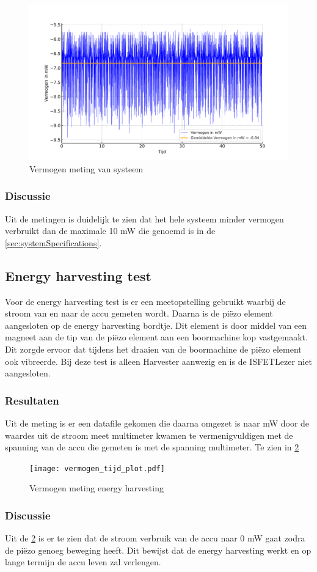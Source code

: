 \begin{figure}[ht]
    \centering
    \includegraphics[width=\textwidth]{img/vermogensMeting.pdf}
    \caption{Vermogen meting van systeem}
    \label{fig:vermogenMeting}
\end{figure}

\subsubsection{Discussie}
Uit de metingen is duidelijk te zien dat het hele systeem minder vermogen verbruikt dan de maximale 10 mW die genoemd is in de \cref{sec:systemSpecifications}. 


\subsection{Energy harvesting test}
Voor de energy harvesting test is er een meetopstelling gebruikt waarbij de stroom van en naar de accu gemeten wordt. Daarna is de piëzo element aangesloten op de energy harvesting bordtje. Dit element is door middel van een magneet aan de tip van de piëzo element aan een boormachine kop vastgemaakt. Dit zorgde ervoor dat tijdens het draaien van de boormachine de piëzo element ook vibreerde. Bij deze test is alleen Harvester aanwezig en is de ISFETLezer niet aangesloten.

\subsubsection{Resultaten}
Uit de meting is er een datafile gekomen die daarna omgezet is naar mW door de waardes uit de stroom meet multimeter kwamen te vermenigvuldigen met de spanning van de accu die gemeten is met de spanning multimeter. Te zien in \cref{fig:vermogenPlot}

\begin{figure}[ht]
    \centering
    \texttt{[image: vermogen\_tijd\_plot.pdf]}
    \caption{Vermogen meting energy harvesting}
    \label{fig:vermogenPlot}
\end{figure}

\subsubsection{Discussie}
Uit de \cref{fig:vermogenPlot} is er te zien dat de stroom verbruik van de accu naar 0 mW gaat zodra de piëzo genoeg beweging heeft. Dit bewijst dat de energy harvesting werkt en op lange termijn de accu leven zal verlengen.